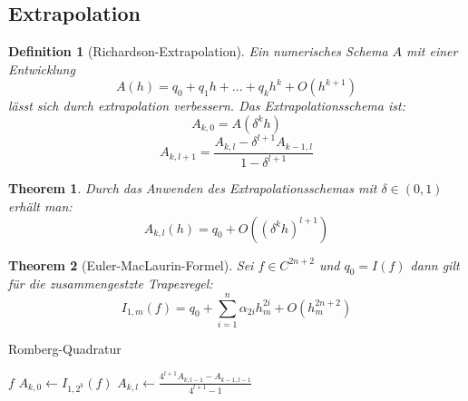 \documentclass[10pt,a4paper]{article}
\newtheorem{theorem}{Theorem}
\newtheorem{definition}{Definition}
\begin{document}
	\subsection{Extrapolation}
	\begin{definition}[Richardson-Extrapolation]
		Ein numerisches Schema $A$ mit einer Entwicklung 
		$$A(h) = q_0 +q_1h + ... + q_kh^k+ O(h^{k+1})$$
		lässt sich durch extrapolation verbessern. Das Extrapolationsschema ist:
		$$A_{k, 0} = A(\delta^kh)$$
		$$A_{k, l+1} = \frac{A_{k, l} - \delta^{l+1}A_{k-1, l}}{1-\delta^{l+1}}$$
	\end{definition}
	\begin{theorem}
		Durch das Anwenden des Extrapolationsschemas mit $\delta \in (0,1)$ erhält man:
		$$A_{k, l}(h) = q_0 + O((\delta^kh)^{l+1})$$
	\end{theorem}
	\begin{theorem}[Euler-MacLaurin-Formel]
		Sei $f\in C^{2n+2}$ und $q_0 = I(f)$ dann gilt für die zusammengestzte Trapezregel:
		$$I_{1,m}(f) = q_0 + \sum_{i=1}^{n}\alpha_{2i}h^{2i}_m + O(h_m^{2n+2})$$
	\end{theorem}
	\begin{algorithm}
		\caption{Romberg-Quadratur}
		\begin{algorithmic}
			\Require $f$
			\State $A_{k, 0} \leftarrow I_{1, 2^k}(f)$
			\EndFor
				\State $A_{k, l} \leftarrow \frac{4^{l+1}A_{k, l-1} -A_{k-1, l-1}}{4^{l+1}-1}$
			\EndFor
			\EndFor
		\end{algorithmic}
	\end{algorithm}
\end{document}
